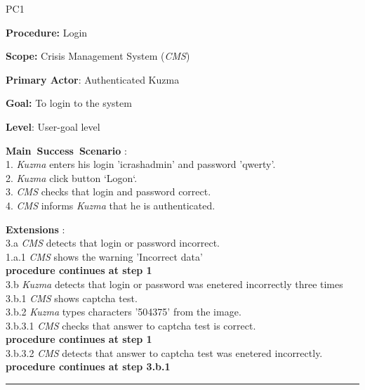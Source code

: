 \begin{lyxlist}{PC1}
\small{
\item [\textbf{Procedure:}] Login
\item [\textbf{Scope:}] Crisis Management System (\emph{CMS})
\item [\textbf{Primary Actor}:] Authenticated Kuzma
\item [\textbf{Goal:}] To login to the system
\item [\textbf{Level}:] User-goal level
\item [\textbf{Main~Success~Scenario}]:\\
1. \emph{Kuzma} enters his login 'icrashadmin' and password 'qwerty'. \\
2. \emph{Kuzma} click button `Logon`.\\
3. \emph{CMS} checks that login and password correct.\\
4. \emph{CMS} informs \emph{Kuzma} that he is authenticated.\\
\item [\textbf{Extensions}]:\\
3.a \emph{CMS} detects that login or password incorrect.\\
\hspace*{0.5cm} 1.a.1 \emph{CMS} shows the warning 'Incorrect data'\\ 
\hspace*{0.5cm} \textbf{procedure continues at step 1}\\
3.b \emph{Kuzma} detects that login or password was enetered incorrectly three
times\\
\hspace*{0.5cm} 3.b.1 \emph{CMS} shows captcha test.\\ 
\hspace*{0.5cm} 3.b.2 \emph{Kuzma} types characters '504375' from the image.\\ 
\hspace*{0.5cm} 3.b.3.1 \emph{CMS} checks that answer to captcha test is
correct.\\
\hspace*{0.5cm} \textbf{procedure continues at step 1} \\
\hspace*{0.5cm} 3.b.3.2 \emph{CMS} detects that answer to captcha test was
enetered incorrectly.\\
\hspace*{0.5cm} \textbf{procedure continues at step 3.b.1}
}
\end{lyxlist}
\hrule
\vspace{0.5cm}

